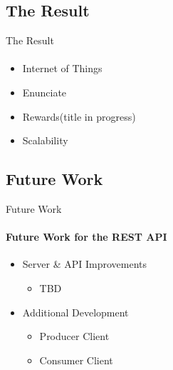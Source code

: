    \subsection{The Result}
    \begin{frame}[t]{The Result}\framesubtitle{}   
        \begin{itemize}
            \item Internet of Things
            \item Enunciate
            \item Rewards(title in progress)
            \item Scalability
        \end{itemize}
    \end{frame}

    \subsection{Future Work}
    \begin{frame}[t]{Future Work}\framesubtitle{Future Work for the REST API}
        \begin{itemize}
            \item Server \& API Improvements
            \begin{itemize}
                    \item TBD
            \end{itemize}
            \item Additional Development
            \begin{itemize}
                    \item Producer Client
                    \item Consumer Client
            \end{itemize}
        \end{itemize}
    \end{frame}